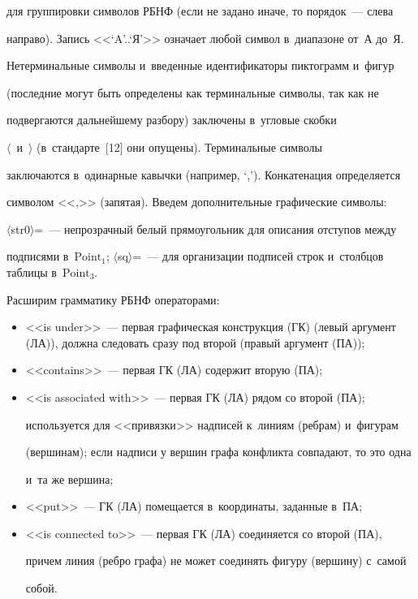 для группировки символов РБНФ (если не задано иначе, то порядок~--- слева 

направо). Запись <<`A'..`Я'>> означает любой символ в~диапазоне от~А до~Я. 

Нетерминальные символы и~введенные идентификаторы пиктограмм и~фигур 

(последние могут быть определены как терминальные символы, так как не 

подвергаются дальнейшему разбору) заключены в~угловые скобки 

$\langle$~и~$\rangle$ (в~стандарте~[12] они опущены). Терминальные символы 

заключаются в~одинарные кавычки (например, `,'). Конкатенация определяется 

символом <<,>> (запятая). Введем дополнительные графические символы: 

$\langle$str0$\rangle$\;=\;~--- непрозрачный белый прямоугольник для описания отступов между 

подписями в~$\mathrm{Point}_1$; $\langle$sq$\rangle$\;=\;~--- для организации подписей строк и~столбцов таблицы в~$\mathrm{Point}_3$. 

Расширим грамматику РБНФ операторами:

  \begin{itemize}

\item <<is under>>~--- первая графическая конструкция (ГК) (левый аргумент (ЛА)), должна следовать сразу под второй (правый аргумент (ПА));

\item <<contains>>~--- первая ГК (ЛА) содержит вторую (ПА);

\item <<is associated with>>~--- первая ГК (ЛА) рядом со второй (ПА); 

используется для <<привязки>> надписей к~линиям (ребрам) и~фигурам 

(вершинам); если надписи у вершин графа конфликта совпадают, то это одна 

и~та же вершина;

\item <<put>>~--- ГК (ЛА) помещается в~координаты, заданные в~ПА;

\item <<is connected to>>~--- первая ГК (ЛА) соединяется со второй (ПА), 

причем линия (ребро графа) не может соединять фигуру (вершину) с~самой 

собой. 

\end{itemize}

